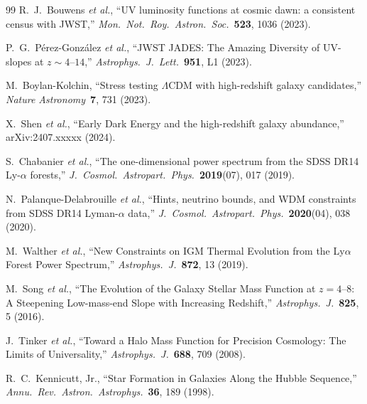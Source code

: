 \documentclass[aps,prd,twocolumn,superscriptaddress,nofootinbib]{revtex4-2}
\begin{document}
\begin{thebibliography}{99}
R.~J.~Bouwens \emph{et al.},
``UV luminosity functions at cosmic dawn: a consistent census with
JWST,''
\emph{Mon.\ Not.\ Roy.\ Astron.\ Soc.}\ \textbf{523}, 1036 (2023).

P.~G.~P\'erez-Gonz\'alez \emph{et al.},
``JWST JADES: The Amazing Diversity of UV-slopes at $z \sim 4$--$14$,''
\emph{Astrophys.\ J.\ Lett.}\ \textbf{951}, L1 (2023).

M.~Boylan-Kolchin,
``Stress testing $\Lambda$CDM with high-redshift galaxy candidates,''
\emph{Nature Astronomy}\ \textbf{7}, 731 (2023).

X.~Shen \emph{et al.},
``Early Dark Energy and the high-redshift galaxy abundance,''
arXiv:2407.xxxxx (2024).

S.~Chabanier \emph{et al.},
``The one-dimensional power spectrum from the SDSS DR14 Ly-$\alpha$
forests,''
\emph{J.\ Cosmol.\ Astropart.\ Phys.}\ \textbf{2019}(07), 017 (2019).

N.~Palanque-Delabrouille \emph{et al.},
``Hints, neutrino bounds, and WDM constraints from SDSS DR14
Lyman-$\alpha$ data,''
\emph{J.\ Cosmol.\ Astropart.\ Phys.}\ \textbf{2020}(04), 038 (2020).

M.~Walther \emph{et al.},
``New Constraints on IGM Thermal Evolution from the Ly$\alpha$ Forest
Power Spectrum,''
\emph{Astrophys.\ J.}\ \textbf{872}, 13 (2019).

M.~Song \emph{et al.},
``The Evolution of the Galaxy Stellar Mass Function at $z = 4$--$8$:
A Steepening Low-mass-end Slope with Increasing Redshift,''
\emph{Astrophys.\ J.}\ \textbf{825}, 5 (2016).

J.~Tinker \emph{et al.},
``Toward a Halo Mass Function for Precision Cosmology: The Limits
of Universality,''
\emph{Astrophys.\ J.}\ \textbf{688}, 709 (2008).

R.~C.~Kennicutt, Jr.,
``Star Formation in Galaxies Along the Hubble Sequence,''
\emph{Annu.\ Rev.\ Astron.\ Astrophys.}\ \textbf{36}, 189 (1998).

\end{thebibliography}
\end{document}
